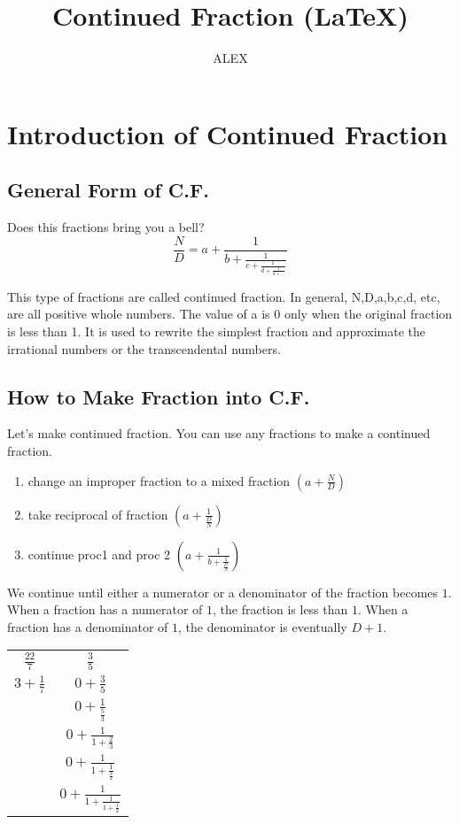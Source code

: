 \documentclass{jreport}
\title{Continued Fraction (\LaTeX)}
\author{ALEX}
\date{}
\begin{document}
\maketitle

\chapter*{Introduction of Continued Fraction}

\section*{General Form of C.F.}
Does this fractions bring you a bell?
\[\frac{N}{D}=a+\frac{1}{b+\frac{1}{c+\frac{1}{d+\frac{1}{d+...}}}}\]

This type of fractions are called continued fraction. In general, N,D,a,b,c,d, etc, are all positive whole numbers. The value of a is 0 only when the original fraction is less than 1. It is used to rewrite the simplest fraction and approximate the irrational numbers or the transcendental numbers.

\section*{How to Make Fraction into C.F.}
Let's make continued fraction. You can use any fractions to make a continued fraction. 

\begin{minipage}{\textwidth}
\begin{center}
\begin{enumerate}
\item change an improper fraction to a mixed fraction $(a+\frac{N}{D})$
\item take reciprocal of fraction $(a+\frac{1}{\frac{D}{N}})$
\item continue proc1 and proc 2 $(a+\frac{1}{b+\frac{1}{\frac{D}{N}}})$
\end{enumerate}
\end{center}
\end{minipage}

We continue until either a numerator or a denominator of the fraction becomes $1$. When a fraction has a numerator of $1$, the fraction is less than $1$. When a fraction has a denominator of $1$, the denominator is eventually $D+1$. 

\begin{table}[htbp]
\begin{center}
\begin{tabular}{|c|c|}
\hline
$\frac{22}{7}$ & $\frac{3}{5}$\\
$3+\frac{1}{7}$ & $0+\frac{3}{5}$\\
 & $0+\frac{1}{\frac{5}{3}}$\\
 & $0+\frac{1}{1+\frac{2}{3}}$\\
 & $0+\frac{1}{1+\frac{1}{\frac{3}{2}}}$\\
 & $0+\frac{1}{1+\frac{1}{1+\frac{1}{2}}}$\\
\hline
\end{tabular}
\end{center}
\end{table}
\end{document}
